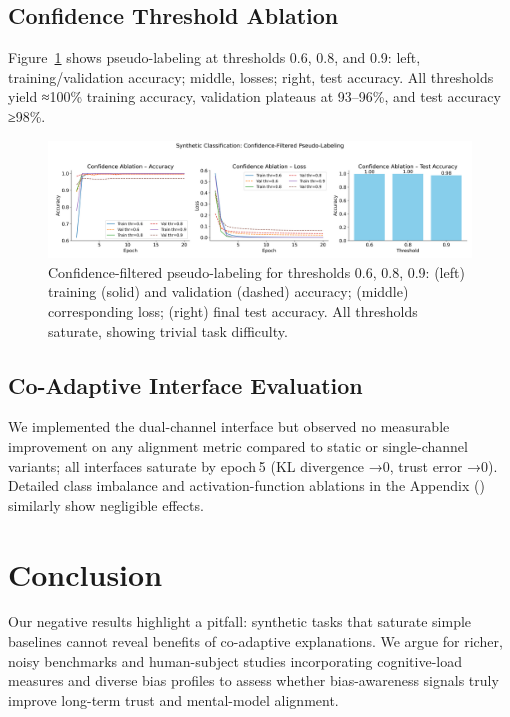 \documentclass{article} %
\begin{document}
\subsection{Confidence Threshold Ablation}
Figure~\ref{fig:confidence} shows pseudo-labeling at thresholds 0.6, 0.8, and 0.9: left, training/validation accuracy; middle, losses; right, test accuracy. All thresholds yield ≈100\% training accuracy, validation plateaus at 93–96\%, and test accuracy ≥98\%.

\begin{figure}[t]
  \centering
  \includegraphics[width=\textwidth]{confidence_ablation_summary.png}
  \caption{Confidence-filtered pseudo-labeling for thresholds 0.6, 0.8, 0.9: (left) training (solid) and validation (dashed) accuracy; (middle) corresponding loss; (right) final test accuracy. All thresholds saturate, showing trivial task difficulty.}
  \label{fig:confidence}
\end{figure}

\subsection{Co-Adaptive Interface Evaluation}
We implemented the dual-channel interface but observed no measurable improvement on any alignment metric compared to static or single-channel variants; all interfaces saturate by epoch 5 (KL divergence →0, trust error →0). Detailed class imbalance and activation-function ablations in the Appendix () similarly show negligible effects.

\section{Conclusion}
Our negative results highlight a pitfall: synthetic tasks that saturate simple baselines cannot reveal benefits of co-adaptive explanations. We argue for richer, noisy benchmarks and human-subject studies incorporating cognitive-load measures \citep{sweller1988cognitiveld} and diverse bias profiles to assess whether bias-awareness signals truly improve long-term trust and mental-model alignment.
\end{document}
